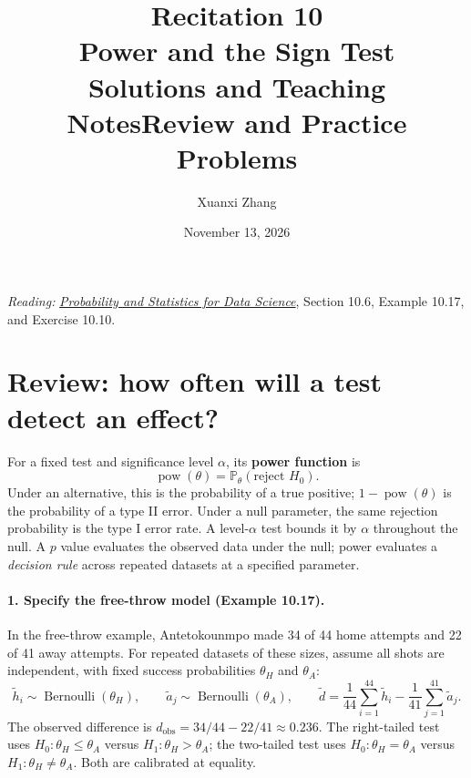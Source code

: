 \documentclass[11pt]{article}
\title{\huge Recitation 10\\[0.35em]\normalsize Power and the Sign Test\\[0.35em]
 \large\ifsolutions Solutions and Teaching Notes\else Review and Practice Problems\fi}
\author{Xuanxi Zhang}
\date{November 13, 2026}
\newcommand{\rv}[1]{\widetilde{#1}}
\newcommand{\Pbb}{\mathbb P}
\newcommand{\pow}{\operatorname{pow}}
\begin{document}
\maketitle
\noindent\textit{Reading:}
\href{https://github.com/cfgranda/ps4ds/blob/main/ps4ds_preprint.pdf}
{\emph{Probability and Statistics for Data Science}},
Section 10.6, Example 10.17, and Exercise 10.10.

\section*{Review: how often will a test detect an effect?}
For a fixed test and significance level $\alpha$, its \textbf{power function} is
\[
 \pow(\theta)=\Pbb_\theta(\text{reject }H_0).
\]
Under an alternative, this is the probability of a true positive;
$1-\pow(\theta)$ is the probability of a type II error.
Under a null parameter, the same rejection probability is the type I error
rate. A level-$\alpha$ test bounds it by $\alpha$ throughout the null.
A $p$ value evaluates the observed data under the null; power evaluates a
\emph{decision rule} across repeated datasets at a specified parameter.

\paragraph{1. Specify the free-throw model (Example 10.17).}
In the free-throw example, Antetokounmpo made 34 of 44 home attempts and
22 of 41 away attempts. For repeated datasets of these sizes, assume all shots are
independent, with fixed success probabilities $\theta_H$ and $\theta_A$:
\[
 \rv h_i\sim\operatorname{Bernoulli}(\theta_H),\qquad
 \rv a_j\sim\operatorname{Bernoulli}(\theta_A),\qquad
 \rv d=\frac1{44}\sum_{i=1}^{44}\rv h_i-
       \frac1{41}\sum_{j=1}^{41}\rv a_j.
\]
The observed difference is $d_{\mathrm{obs}}=34/44-22/41\approx0.236$.
The right-tailed test uses $H_0:\theta_H\leq\theta_A$ versus
$H_1:\theta_H>\theta_A$; the two-tailed test uses
$H_0:\theta_H=\theta_A$ versus $H_1:\theta_H\ne\theta_A$.
Both are calibrated at equality.
\end{document}
